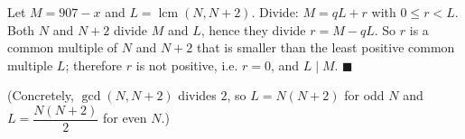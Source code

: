 Let $M=907-x$ and $L=\operatorname{lcm}(N,N+2)$. Divide: $M=qL+r$ with $0\le r<L$. Both $N$ and $N+2$ divide $M$ and $L$, hence they divide $r=M-qL$. So $r$ is a common multiple of $N$ and $N+2$ that is smaller than the least positive common multiple $L$; therefore $r$ is not positive, i.e. $r=0$, and $L\mid M$. $\blacksquare$

(Concretely, $\gcd(N,N+2)$ divides $2$, so $L=N(N+2)$ for odd $N$ and $L=\dfrac{N(N+2)}{2}$ for even $N$.)
